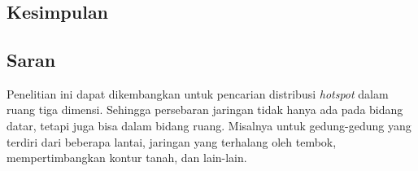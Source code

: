 \chapter{\babLima}

\section{Kesimpulan}



\section{Saran}

Penelitian ini dapat dikembangkan untuk pencarian distribusi \textit{hotspot} dalam ruang tiga dimensi. Sehingga persebaran jaringan tidak hanya ada pada bidang datar, tetapi juga bisa dalam bidang ruang. Misalnya untuk gedung-gedung yang terdiri dari beberapa lantai, jaringan yang terhalang oleh tembok, mempertimbangkan kontur tanah, dan lain-lain.


